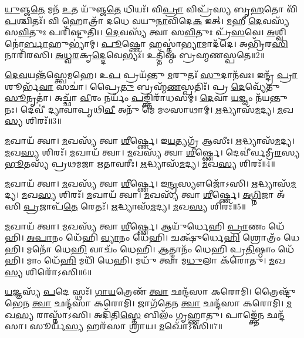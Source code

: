 \-\ul{𑌯𑍁}\-𑌞𑍍𑌜\-\ul{𑌤𑍇} 𑌮𑌨᳴ \ul{𑌉}\-𑌤 𑌯𑍁᳴𑌞𑍍𑌜\-\ul{𑌤𑍇} 𑌧𑌿𑌯𑌃᳴। 
𑌵𑌿\-\ul{𑌪𑍍𑌰𑌾} 𑌵𑌿𑌪𑍍𑌰᳴𑌸𑍍𑌯 𑌬𑍃\-\ul{𑌹}\-𑌤𑍋 𑌵𑌿᳴\-\ul{𑌪}\-𑌶𑍍𑌚𑌿𑌤𑌃᳴। 
𑌵𑌿 𑌹𑍋𑌤𑍍𑌰𑌾᳴ 𑌦𑌧𑍇 𑌵𑌯𑍁\-\ul{𑌨𑌾}\-𑌵𑌿𑌦𑍇\-\ul{𑌕} 𑌇𑌤𑍍। 
\-\ul{𑌮}\-𑌹𑍀 \ul{𑌦𑍇}\-𑌵𑌸𑍍𑌯᳴ 𑌸\-\ul{𑌵𑌿}\-𑌤𑍁𑌃 𑌪𑌰𑌿᳴𑌷𑍍𑌟𑍁𑌤𑌿𑌃। 
\-\ul{𑌦𑍇}\-𑌵𑌸𑍍𑌯᳴ 𑌤𑍍𑌵𑌾 𑌸\-\ul{𑌵𑌿}\-𑌤𑍁𑌃 𑌪𑍍𑌰᳴\-\ul{𑌸}\-𑌵𑍇। 
\-\ul{𑌅}\-𑌶𑍍𑌵𑌿𑌨𑍋॑\-\ul{𑌰𑍍𑌬𑌾}\-𑌹𑍁𑌭𑍍𑌯𑌾॑𑌮𑍍। 
\-\ul{𑌪𑍂}\-𑌷𑍍𑌣𑍋 𑌹𑌸𑍍𑌤𑌾॑\-\ul{𑌭𑍍𑌯𑌾}\-𑌮𑌾𑌦᳴𑌦𑍇। 
𑌅𑌭𑍍𑌰𑌿᳴𑌰\-\ul{𑌸𑌿} 𑌨𑌾𑌰𑌿᳴𑌰𑌸𑌿। 
\-\ul{𑌅}\-\-\ul{𑌧𑍍𑌵}\-\-\ul{𑌰}\-𑌕𑍃\-\ul{𑌦𑍍𑌦𑍇}\-𑌵𑍇𑌭𑍍𑌯𑌃᳴। 
𑌉𑌤𑍍𑌤𑌿᳴𑌷𑍍𑌠 𑌬𑍍𑌰𑌹𑍍𑌮𑌣𑌸𑍍𑌪𑌤𑍇॥2॥

\-\ul{𑌦𑍇}\-\-\ul{𑌵}\-𑌯𑌨𑍍𑌤᳴𑌸𑍍𑌤𑍍𑌵𑍇𑌮𑌹𑍇। 
𑌉\-\ul{𑌪} 𑌪𑍍𑌰𑌯᳴𑌨𑍍𑌤𑍁 \ul{𑌮}\-𑌰𑍁𑌤𑌃᳴ \ul{𑌸𑍁}\-𑌦𑌾𑌨᳴𑌵𑌃। 
𑌇𑌨𑍍𑌦𑍍𑌰᳴ \ul{𑌪𑍍𑌰𑌾}\-𑌶𑍂𑌰𑍍𑌭᳴\-\ul{𑌵𑌾} 𑌸𑌚𑌾॑। 
𑌪𑍍𑌰𑍈\-\ul{𑌤𑍁} 𑌬𑍍𑌰𑌹𑍍𑌮᳴\-\ul{𑌣}\-𑌸𑍍𑌪𑌤𑌿𑌃᳴। 
𑌪𑍍𑌰 \ul{𑌦𑍇}\-𑌵𑍍𑌯𑍇᳴𑌤𑍁 \ul{𑌸𑍂}\-𑌨𑍃𑌤𑌾॑। 
𑌅𑌚𑍍𑌛𑌾᳴ \ul{𑌵𑍀}\-𑌰𑌂 𑌨𑌰𑍍𑌯𑌂᳴ \ul{𑌪}\-𑌙𑍍𑌕𑍍𑌤𑌿𑌰𑌾᳴𑌧𑌸𑌮𑍍। 
\-\ul{𑌦𑍇}\-𑌵𑌾 \ul{𑌯}\-𑌜𑍍𑌞𑌂 𑌨᳴𑌯𑌨𑍍𑌤𑍁 𑌨𑌃। 
𑌦𑍇𑌵𑍀॑ 𑌦𑍍𑌯𑌾𑌵𑌾𑌪𑍃𑌥𑌿\-\ul{𑌵𑍀} 𑌅𑌨𑍁᳴ 𑌮𑍇 𑌮𑍞𑌸𑌾𑌥𑌾𑌮𑍍। 
\-\ul{𑌋}\-𑌦𑍍𑌧𑍍𑌯𑌾𑌸᳴\-\ul{𑌮}\-𑌦𑍍𑌯। 
\-\ul{𑌮}\-𑌖\-\ul{𑌸𑍍𑌯} 𑌶𑌿𑌰𑌃᳴॥3॥

\-\ul{𑌮}\-𑌖𑌾𑌯᳴ 𑌤𑍍𑌵𑌾। 
\-\ul{𑌮}\-𑌖𑌸𑍍𑌯᳴ 𑌤𑍍𑌵𑌾 \ul{𑌶𑍀}\-𑌰𑍍𑌷𑍍𑌣𑍇। 
𑌇\-\ul{𑌯}\-𑌤𑍍𑌯𑌗𑍍𑌰᳴ 𑌆𑌸𑍀𑌃। 
\-\ul{𑌋}\-𑌦𑍍𑌧𑍍𑌯𑌾𑌸᳴\-\ul{𑌮}\-𑌦𑍍𑌯। 
\-\ul{𑌮}\-𑌖\-\ul{𑌸𑍍𑌯} 𑌶𑌿𑌰𑌃᳴। 
\-\ul{𑌮}\-𑌖𑌾𑌯᳴ 𑌤𑍍𑌵𑌾। 
\-\ul{𑌮}\-𑌖𑌸𑍍𑌯᳴ 𑌤𑍍𑌵𑌾 \ul{𑌶𑍀}\-𑌰𑍍𑌷𑍍𑌣𑍇। 
𑌦𑍇𑌵𑍀॑𑌰𑍍𑌵𑌮𑍍𑌰𑍀\-\ul{𑌰}\-𑌸𑍍𑌯 \ul{𑌭𑍂}\-𑌤𑌸𑍍𑌯᳴ 𑌪𑍍𑌰𑌥𑌮𑌜𑌾 𑌋𑌤𑌾𑌵𑌰𑍀𑌃। 
\-\ul{𑌋}\-𑌦𑍍𑌧𑍍𑌯𑌾𑌸᳴\-\ul{𑌮}\-𑌦𑍍𑌯। 
\-\ul{𑌮}\-𑌖\-\ul{𑌸𑍍𑌯} 𑌶𑌿𑌰𑌃᳴॥4॥

\-\ul{𑌮}\-𑌖𑌾𑌯᳴ 𑌤𑍍𑌵𑌾। 
\-\ul{𑌮}\-𑌖𑌸𑍍𑌯᳴ 𑌤𑍍𑌵𑌾 \ul{𑌶𑍀}\-𑌰𑍍𑌷𑍍𑌣𑍇। 
𑌇\-\ul{𑌨𑍍𑌦𑍍𑌰}\-𑌸𑍍𑌯𑍗𑌜𑍋᳴𑌽𑌸𑌿। 
\-\ul{𑌋}\-𑌦𑍍𑌧𑍍𑌯𑌾𑌸᳴\-\ul{𑌮}\-𑌦𑍍𑌯। 
\-\ul{𑌮}\-𑌖\-\ul{𑌸𑍍𑌯} 𑌶𑌿𑌰𑌃᳴। 
\-\ul{𑌮}\-𑌖𑌾𑌯᳴ 𑌤𑍍𑌵𑌾। 
\-\ul{𑌮}\-𑌖𑌸𑍍𑌯᳴ 𑌤𑍍𑌵𑌾 \ul{𑌶𑍀}\-𑌰𑍍𑌷𑍍𑌣𑍇। 
\-\ul{𑌅}\-\-\ul{𑌗𑍍𑌨𑌿}\-𑌜𑌾 𑌅᳴𑌸𑌿 \ul{𑌪𑍍𑌰}\-𑌜𑌾𑌪᳴\-\ul{𑌤𑍇} 𑌰𑍇𑌤𑌃᳴। 
\-\ul{𑌋}\-𑌦𑍍𑌧𑍍𑌯𑌾𑌸᳴\-\ul{𑌮}\-𑌦𑍍𑌯। 
\-\ul{𑌮}\-𑌖\-\ul{𑌸𑍍𑌯} 𑌶𑌿𑌰𑌃᳴॥5॥

\-\ul{𑌮}\-𑌖𑌾𑌯᳴ 𑌤𑍍𑌵𑌾। 
\-\ul{𑌮}\-𑌖𑌸𑍍𑌯᳴ 𑌤𑍍𑌵𑌾 \ul{𑌶𑍀}\-𑌰𑍍𑌷𑍍𑌣𑍇। 
𑌆𑌯𑍁᳴𑌰𑍍𑌧𑍇𑌹𑌿 \ul{𑌪𑍍𑌰𑌾}\-𑌣𑌂 𑌧𑍇᳴𑌹𑌿। 
\-\ul{𑌅}\-\-\ul{𑌪𑌾}\-𑌨𑌂 𑌧𑍇᳴𑌹𑌿 \ul{𑌵𑍍𑌯𑌾}\-𑌨𑌂 𑌧𑍇᳴𑌹𑌿। 
𑌚𑌕𑍍𑌷𑍁᳴𑌰𑍍𑌧𑍇\-\ul{𑌹𑌿} 𑌶𑍍𑌰𑍋𑌤𑍍𑌰𑌂᳴ 𑌧𑍇𑌹𑌿। 
𑌮𑌨𑍋᳴ 𑌧𑍇\-\ul{𑌹𑌿} 𑌵𑌾𑌚𑌂᳴ 𑌧𑍇𑌹𑌿। 
\-\ul{𑌆}\-𑌤𑍍𑌮𑌾𑌨𑌂᳴ 𑌧𑍇𑌹𑌿 𑌪𑍍𑌰\-\ul{𑌤𑌿}\-𑌷𑍍𑌠𑌾𑌂 𑌧𑍇᳴𑌹𑌿। 
𑌮𑌾𑌂 𑌧𑍇᳴\-\ul{𑌹𑌿} 𑌮𑌯𑌿᳴ 𑌧𑍇𑌹𑌿। 
𑌮𑌧𑍁᳴ 𑌤𑍍𑌵𑌾 𑌮\-\ul{𑌧𑍁}\-𑌲𑌾 𑌕᳴𑌰𑍋𑌤𑍁। 
\-\ul{𑌮}\-𑌖\-\ul{𑌸𑍍𑌯} 𑌶𑌿𑌰𑍋᳴𑌽𑌸𑌿॥6॥

\-\ul{𑌯}\-𑌜𑍍𑌞𑌸𑍍𑌯᳴ \ul{𑌪}\-𑌦𑍇 𑌸𑍍𑌥𑌃᳴। 
\-\ul{𑌗𑌾}\-\-\ul{𑌯}\-𑌤𑍍𑌰𑍇𑌣᳴ \ul{𑌤𑍍𑌵𑌾} 𑌛𑌨𑍍𑌦᳴𑌸𑌾 𑌕𑌰𑍋𑌮𑌿। 
𑌤𑍍𑌰𑍈𑌷𑍍𑌟𑍁᳴𑌭𑍇𑌨 \ul{𑌤𑍍𑌵𑌾} 𑌛𑌨𑍍𑌦᳴𑌸𑌾 𑌕𑌰𑍋𑌮𑌿। 
𑌜𑌾𑌗᳴𑌤𑍇𑌨 \ul{𑌤𑍍𑌵𑌾} 𑌛𑌨𑍍𑌦᳴𑌸𑌾 𑌕𑌰𑍋𑌮𑌿। 
\-\ul{𑌮}\-𑌖\-\ul{𑌸𑍍𑌯} 𑌰𑌾𑌸𑍍𑌨𑌾᳴𑌽𑌸𑌿। 
𑌅𑌦𑌿᳴𑌤𑌿\-\ul{𑌸𑍍𑌤𑍇} 𑌬𑌿𑌲𑌂᳴ 𑌗𑍃𑌹𑍍𑌣𑌾𑌤𑍁। 
𑌪𑌾𑌙𑍍𑌕𑍍𑌤𑍇᳴\-\ul{𑌨} 𑌛𑌨𑍍𑌦᳴𑌸𑌾। 
𑌸𑍂𑌰𑍍𑌯᳴\-\ul{𑌸𑍍𑌯} 𑌹𑌰᳴𑌸𑌾 𑌶𑍍𑌰𑌾𑌯। 
\-\ul{𑌮}\-𑌖𑍋᳴𑌽𑌸𑌿॥7॥
\anuvakamend[\-\ul{𑌪}\-\-\ul{𑌤𑍇} 𑌶𑌿𑌰᳴ 𑌋𑌤𑌾𑌵𑌰𑍀𑌰𑍍\mbox{}\-\ul{𑌋}\-𑌦𑍍𑌧𑍍𑌯𑌾𑌸᳴\-\ul{𑌮}\-𑌦𑍍𑌯 \ul{𑌮}\-𑌖\-\ul{𑌸𑍍𑌯} 𑌶𑌿\-\ul{𑌰𑌃} 𑌶𑌿\-\ul{𑌰𑌃} 𑌶𑌿𑌰𑍋᳴𑌽\-\ul{𑌸𑌿} 𑌨𑌵᳴ 𑌚%
]

